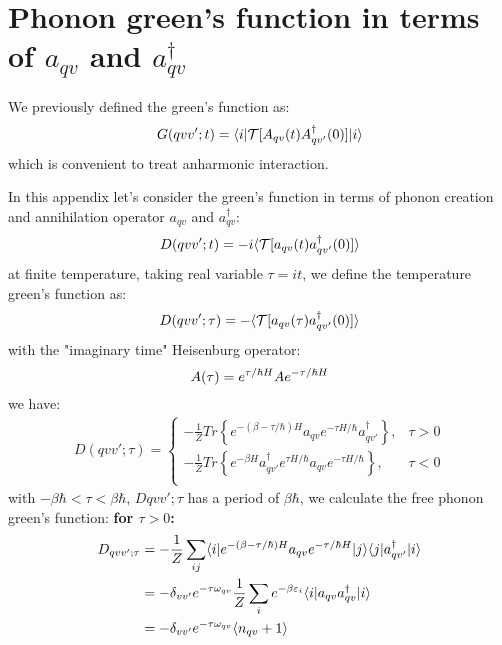 \documentclass{article}
\begin{document}
\section{Phonon green's function in terms of $a_{qv}$ and $a_{qv}^{\dagger}$}
We previously defined the green's function as:
\begin{align}
    G(qvv';t) = \langle i | \mathcal{T}[A_{qv}(t)A_{qv'}^{\dagger}(0)]| i \rangle \notag
\end{align}
which is convenient to treat anharmonic interaction. 

In this appendix let's consider 
the green's function in terms of phonon creation and annihilation operator $a_{qv}$ and $a^{\dagger}_{qv}$:
\begin{equation}
    D(qvv';t) = -i \langle  \mathcal{T}[a_{qv}(t)a_{qv'}^{\dagger}(0)] \rangle \notag
\end{equation}
at finite temperature, taking real variable $\tau = it$, we define the temperature green's function as:
\begin{equation}
    D(qvv';\tau) = -\langle  \mathcal{T}[a_{qv}(\tau)a_{qv'}^{\dagger}(0)] \rangle \notag
\end{equation}
with the "imaginary time" Heisenburg operator:
\begin{equation}
    A(\tau) = e^{\tau/\hbar H} A e^{-\tau/\hbar H} \notag 
\end{equation}
we have:
\begin{align}
    D(qvv';\tau) = 
    \begin{cases}
        -\frac{1}{Z} Tr\left\{ e^{-(\beta-\tau/\hbar)H} a_{qv} e^{-\tau H/\hbar } a_{qv'}^{\dagger} \right\}, &\tau > 0 \\
        -\frac{1}{Z} Tr\left\{ e^{-\beta H} a_{qv'}^{\dagger} e^{\tau H/\hbar } a_{qv} e^{- \tau H/\hbar } \right\}, &\tau < 0 \\
    \end{cases}
\end{align}
with $-\beta\hbar < \tau < \beta \hbar$,
$D{qvv';\tau}$ has a period of $\beta\hbar$, we calculate the free phonon green's function:
\textbf{for $\tau > 0$:}
\begin{align}
    D_{qvv';\tau} &= -\frac{1}{Z} \sum_{ij} 
                    \langle i | e^{-(\beta-\tau/\hbar)H} a_{qv} e^{-\tau/\hbar H} | j\rangle \langle j | a^{\dagger}_{qv'} | i \rangle \notag \\
                  &= -\delta_{vv'} e^{-\tau\omega_{qv}} \frac{1}{Z} \sum_i e^{-\beta \varepsilon_i} \langle i | a_{qv} a^{\dagger}_{qv} | i\rangle \notag \\
                  &= -\delta_{vv'} e^{-\tau\omega_{qv}} \langle n_{qv} + 1 \rangle 
\end{align}
\end{document}
